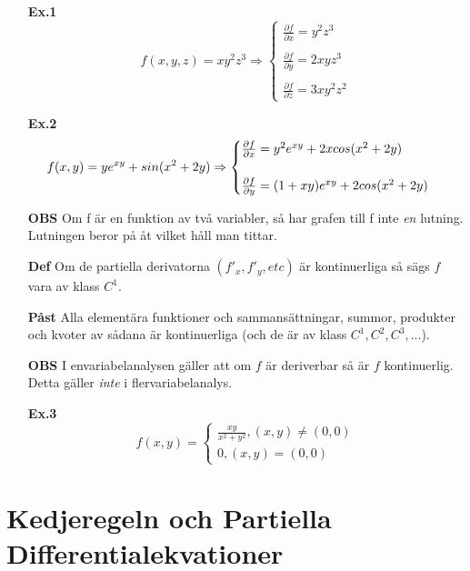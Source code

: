 \documentclass[a4paper,12pt]{article}
\newcommand{\partialfrac}[2]{\frac{\partial #1}{\partial #2}}
\begin{document}
\begin{itemize}
\item[\textbf{Ex.1}]
  \begin{equation*}
    f(x,y,z) = xy^2z^3 \Rightarrow 
    \begin{cases}
      \partialfrac{f}{x}=y^2z^3\\ \\
      \partialfrac{f}{y}=2xyz^3\\ \\
      \partialfrac{f}{z}=3xy^2z^2
    \end{cases}
  \end{equation*}
\item[\textbf{Ex.2}]
  \begin{equation*}
    f(x,y)=ye^{xy}+sin(x^2+2y) \Rightarrow
    \begin{cases}
      \partialfrac{f}{x} = y^2e^{xy}+2xcos(x^2+2y) \\ \\
      \partialfrac{f}{y} = (1+xy)e^{xy}+2cos(x^2+2y)
    \end{cases}\\
  \end{equation*}
\item[\textbf{OBS}]
  Om f är en funktion av två variabler, så har grafen till f inte \textit{en}
  lutning. Lutningen beror på åt vilket håll man tittar.
\item[\textbf{Def}]
  Om de partiella derivatorna $(f'_x, f'_y, etc)$ är kontinuerliga så sägs $f$
  vara av klass $C^1$.
\item[\textbf{Påst}]
  Alla elementära funktioner och sammansättningar, summor, produkter och kvoter
  av sådana är kontinuerliga (och de är av klass $C^1,C^2,C^3,...$).
\item[\textbf{OBS}]
  I envariabelanalysen gäller att om $f$ är deriverbar så är $f$ kontinuerlig.
  Detta gäller \textit{inte} i flervariabelanalys.
\item[\textbf{Ex.3}]
  \begin{equation*}
    f(x,y) =
    \begin{cases}
      \frac{xy}{x^2+y^2}, (x,y)\neq(0,0) \\
      0, (x,y)=(0,0)
    \end{cases}
  \end{equation*}
\end{itemize}

\section{Kedjeregeln och Partiella Differentialekvationer}
\end{document}
